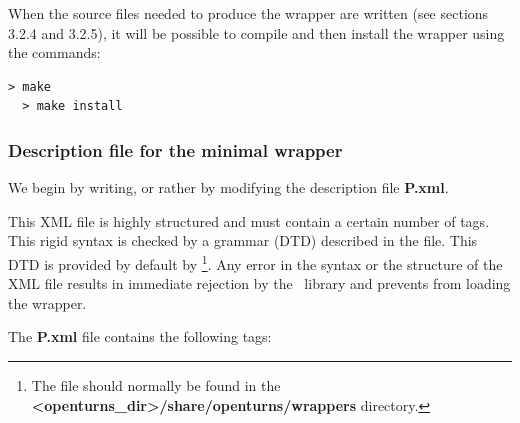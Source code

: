 When the source files needed to produce the wrapper are written (see sections 3.2.4 and 3.2.5), it will be possible to compile and then install the wrapper using the commands:

\lstset{language=Bash, basicstyle=\normalsize}
\begin{lstlisting}[frame=TBRL]
  > make
  > make install
\end{lstlisting}

\subsubsection{Description file for the minimal wrapper}

We begin by writing, or rather by modifying the description file {\bf P.xml}.

This XML file is highly structured and must contain a certain number of tags. This rigid syntax is checked by a grammar (DTD) described in the  file. This DTD is provided by default by \OT\footnote{The file should normally be found in the {\bf <openturns\_dir>/share/openturns/wrappers} directory.}. Any error in the syntax or the structure of the XML file results in immediate rejection by the \OT\ library and prevents from loading the wrapper.

The {\bf P.xml} file contains the following tags:

